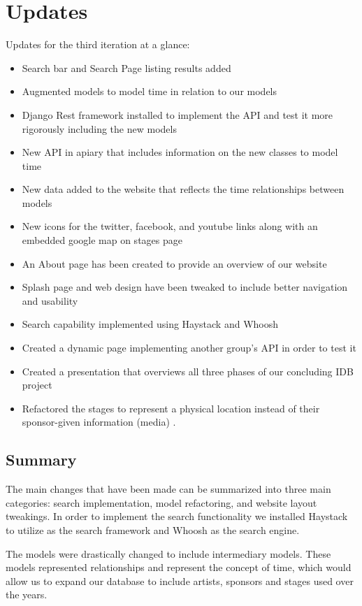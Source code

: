 \documentclass[12pt,english]{scrartcl}
\begin{document}
\section{Updates}
Updates for the third iteration at a glance:
\begin{itemize}
 \item Search bar and Search Page listing results added
 \item Augmented models to model time in relation to our models
 \item Django Rest framework installed to implement the API and test it more rigorously including the new models
 \item New API in apiary that includes information on the new classes to model time
 \item New data added to the website that reflects the time relationships between models
 \item New icons for the twitter, facebook, and youtube links along with an embedded google map on stages page
 \item An About page has been created to provide an overview of our website
 \item Splash page and web design have been tweaked to include better navigation and usability
 \item Search capability implemented using Haystack and Whoosh
 \item Created a dynamic page implementing another group's API in order to test it 
 \item Created a presentation that overviews all three phases of our concluding IDB project
 \item Refactored the stages to represent a physical location instead of their sponsor-given information (media) .
\end{itemize}

\subsection{Summary}
The main changes that have been made can be summarized into three main categories: search implementation, model refactoring, and website layout tweakings.
In order to implement the search functionality we installed Haystack to utilize as the search framework and Whoosh as the search engine.

The models were drastically changed to include intermediary models. These models represented relationships and represent the concept of time, which would allow us to expand our database to include artists, sponsors and stages used over the years.
\end{document}
